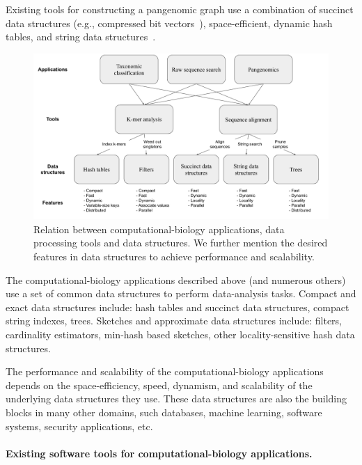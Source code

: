 \begin{itemize}[leftmargin=*]
Existing tools for constructing a pangenomic graph use a combination of succinct data structures (e.g., compressed bit vectors~\cite{garrison2018variation}), space-efficient, dynamic hash tables, and string data structures~\cite{pandey2021variantstore}.

\end{itemize}

\setlength\intextsep{0pt}
\begin{figure}
\vspace{-5pt}
\centering
\includegraphics[width=\textwidth]{images/PPOSS_App_DS}
\caption{Relation between computational-biology applications, data processing tools and data structures. We further mention the desired features in data structures to achieve performance and scalability.}
\label{fig1}
\end{figure}


The computational-biology applications described above (and numerous others)  use a set of common data structures to perform data-analysis tasks.
Compact and exact data structures include: hash tables and succinct data structures, compact string indexes, trees.
Sketches and approximate data structures include: filters, cardinality estimators,  min-hash based sketches, other locality-sensitive hash data structures.

The performance and scalability of the computational-biology applications
depends on the space-efficiency, speed, dynamism, and scalability of the
underlying data structures they use. These data structures are also the building
blocks in many other domains, such databases, machine learning, software
systems, security applications, etc.


\paragraph{Existing software tools for computational-biology applications.}

